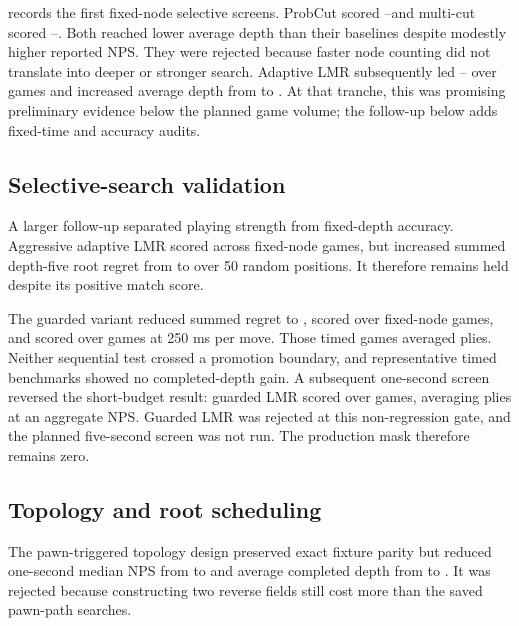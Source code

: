  records the first fixed-node selective screens. ProbCut scored \PhaseThreeProbCutWins--\PhaseThreeProbCutBaselineWins and multi-cut scored \PhaseThreeMultiCutWins--\PhaseThreeMultiCutBaselineWins. Both reached lower average depth than their baselines despite modestly higher reported NPS. They were rejected because faster node counting did not translate into deeper or stronger search. Adaptive LMR subsequently led \PhaseThreeAdaptiveLmrWins--\PhaseThreeAdaptiveLmrBaselineWins{} over \PhaseThreeAdaptiveLmrGames{} games and increased average depth from \PhaseThreeAdaptiveLmrBaselineDepth{} to \PhaseThreeAdaptiveLmrDepth{}. At that tranche, this was promising preliminary evidence below the planned game volume; the follow-up below adds fixed-time and accuracy audits.


\subsection{Selective-search validation}
A larger follow-up separated playing strength from fixed-depth accuracy.
Aggressive adaptive LMR scored \AggressiveLmrFixedNodeScore{} across
\AggressiveLmrFixedNodeGames{} fixed-node games, but increased summed
depth-five root regret from \SelectiveBaselineRegret{} to
\AggressiveLmrRegret{} over 50 random positions. It therefore remains held
despite its positive match score.

The guarded variant reduced summed regret to \GuardedLmrRegret{}, scored
\GuardedLmrFixedNodeScore{} over \GuardedLmrFixedNodeGames{} fixed-node games,
and scored \GuardedLmrTimedScore{} over \GuardedLmrTimedGames{} games at
250 ms per move. Those timed games averaged \GuardedLmrTimedAveragePlies{}
plies. Neither sequential test crossed a promotion boundary, and representative
timed benchmarks showed no completed-depth gain. A subsequent one-second
screen reversed the short-budget result: guarded LMR scored
\GuardedLmrOneSecondScore{} over \GuardedLmrOneSecondGames{} games, averaging
\GuardedLmrOneSecondAveragePlies{} plies at an aggregate
\GuardedLmrOneSecondNps{} NPS. Guarded LMR was rejected at this non-regression
gate, and the planned five-second screen was not run. The production mask
therefore remains zero.



\subsection{Topology and root scheduling}
The pawn-triggered topology design preserved exact fixture parity but reduced
one-second median NPS from \TopologyVFourBaselineNps{} to
\TopologyVFourCandidateNps{} and average completed depth from
\TopologyVFourBaselineDepth{} to \TopologyVFourCandidateDepth{}. It was
rejected because constructing two reverse fields still cost more than the
saved pawn-path searches.

